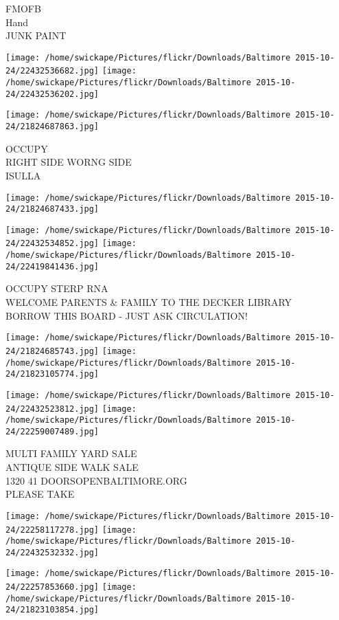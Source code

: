\documentclass[10pt,letterpaper]{article}
\begin{document}
FMOFB\\
Hand\\
JUNK PAINT
\pagebreak

\texttt{[image: /home/swickape/Pictures/flickr/Downloads/Baltimore 2015-10-24/22432536682.jpg]}
\texttt{[image: /home/swickape/Pictures/flickr/Downloads/Baltimore 2015-10-24/22432536202.jpg]}

\vspace{0.25in}
\texttt{[image: /home/swickape/Pictures/flickr/Downloads/Baltimore 2015-10-24/21824687863.jpg]}

OCCUPY\\
RIGHT SIDE WORNG SIDE\\
ISULLA
\pagebreak

\texttt{[image: /home/swickape/Pictures/flickr/Downloads/Baltimore 2015-10-24/21824687433.jpg]}

\vspace{0.25in}
\texttt{[image: /home/swickape/Pictures/flickr/Downloads/Baltimore 2015-10-24/22432534852.jpg]}
\texttt{[image: /home/swickape/Pictures/flickr/Downloads/Baltimore 2015-10-24/22419841436.jpg]}

OCCUPY STERP RNA\\
WELCOME PARENTS \& FAMILY TO THE DECKER LIBRARY\\
BORROW THIS BOARD {-} JUST ASK CIRCULATION!
\pagebreak

\texttt{[image: /home/swickape/Pictures/flickr/Downloads/Baltimore 2015-10-24/21824685743.jpg]}
\texttt{[image: /home/swickape/Pictures/flickr/Downloads/Baltimore 2015-10-24/21823105774.jpg]}

\texttt{[image: /home/swickape/Pictures/flickr/Downloads/Baltimore 2015-10-24/22432523812.jpg]}
\texttt{[image: /home/swickape/Pictures/flickr/Downloads/Baltimore 2015-10-24/22259007489.jpg]}

MULTI FAMILY YARD SALE\\
ANTIQUE SIDE WALK SALE\\
1320 41 DOORSOPENBALTIMORE.ORG\\
PLEASE TAKE
\pagebreak

\texttt{[image: /home/swickape/Pictures/flickr/Downloads/Baltimore 2015-10-24/22258117278.jpg]}
\texttt{[image: /home/swickape/Pictures/flickr/Downloads/Baltimore 2015-10-24/22432532332.jpg]}

\texttt{[image: /home/swickape/Pictures/flickr/Downloads/Baltimore 2015-10-24/22257853660.jpg]}
\texttt{[image: /home/swickape/Pictures/flickr/Downloads/Baltimore 2015-10-24/21823103854.jpg]}
\end{document}
